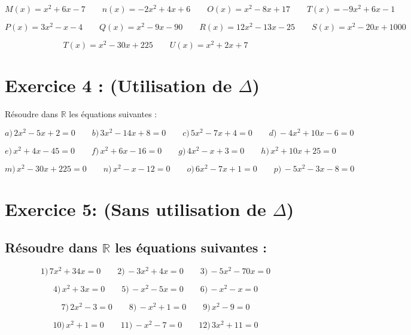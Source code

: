 \documentclass[12pt]{article}
\begin{document}
\[
M(x) = x^2 + 6x - 7 \quad\quad n(x) = -2x^2 + 4x + 6 \quad\quad O(x) = x^2 - 8x + 17 \quad\quad T(x) = -9x^2 + 6x - 1
\]

\[
P(x) = 3x^2 - x - 4 \quad\quad Q(x) = x^2 - 9x - 90 \quad\quad R(x) = 12x^2 - 13x - 25 \quad\quad S(x) = x^2 - 20x + 1000
\]

\[
T(x) = x^2 - 30x + 225 \quad\quad U(x) = x^2 + 2x + 7
\]

\section*{Exercice 4 : (Utilisation de \(\Delta\))}

Résoudre dans \(\mathbb{R}\) les équations suivantes :

\[
a) \, 2x^2 - 5x + 2 = 0 \quad\quad b) \, 3x^2 - 14x + 8 = 0 \quad\quad c) \, 5x^2 - 7x + 4 = 0 \quad\quad d) \, -4x^2 + 10x - 6 = 0
\]

\[
e) \, x^2 + 4x - 45 = 0 \quad\quad f) \, x^2 + 6x - 16 = 0 \quad\quad g) \, 4x^2 - x + 3 = 0 \quad\quad h) \, x^2 + 10x + 25 = 0
\]

\[
m) \, x^2 - 30x + 225 = 0 \quad\quad n) \, x^2 - x - 12 = 0 \quad\quad o) \, 6x^2 - 7x + 1 = 0 \quad\quad p) \, -5x^2 - 3x - 8 = 0
\]

\section*{Exercice 5: (Sans utilisation de \(\Delta\))}

\subsection*{Résoudre dans \(\mathbb{R}\) les équations suivantes :}

\[
1) \, 7x^2 + 34x = 0 \quad\quad 2) \, -3x^2 + 4x = 0 \quad\quad 3) \, -5x^2 - 70x = 0
\]

\[
4) \, x^2 + 3x = 0 \quad\quad 5) \, -x^2 - 5x = 0 \quad\quad 6) \, -x^2 - x = 0
\]

\[
7) \, 2x^2 - 3 = 0 \quad\quad 8) \, -x^2 + 1 = 0 \quad\quad 9) \, x^2 - 9 = 0
\]

\[
10) \, x^2 + 1 = 0 \quad\quad 11) \, -x^2 - 7 = 0 \quad\quad 12) \, 3x^2 + 11 = 0
\]
\end{document}
